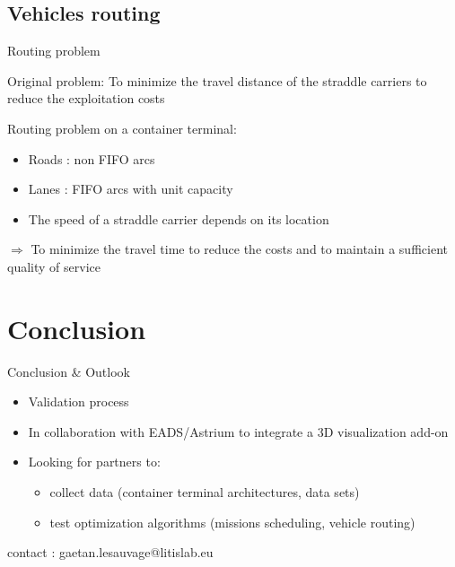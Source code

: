 \documentclass{beamer}
\begin{document}
\subsection*{Vehicles routing}
\begin{frame}{Routing problem}
    \begin{block}{Original problem: }
      To minimize the travel distance of the straddle carriers to reduce the exploitation costs
    \end{block}
\pause
    \begin{block}{Routing problem on a container terminal:}
       \begin{itemize} 
	  \item Roads : non FIFO arcs
	  \item Lanes : FIFO arcs with unit capacity
	  \item The speed of a straddle carrier depends on its location
	
	\end{itemize}
	\pause
	\begin{center}
	    $\Rightarrow$ To minimize the travel time to reduce the costs and to maintain a sufficient quality of service
	  \end{center}
    \end{block}
  \end{frame}

\section{Conclusion}
    \begin{frame}{Conclusion \& Outlook}
    \begin{itemize}
     \item Validation process
    \pause
     \item In collaboration with EADS/Astrium to integrate a 3D visualization add-on
    \pause
     \item Looking for partners to: 
	\begin{itemize}
	 \item collect data (container terminal architectures, data sets)
	 \item test optimization algorithms (missions scheduling, vehicle routing)
	\end{itemize}
    \end{itemize}
  \pause
  \begin{center}
  contact : gaetan.lesauvage@litislab.eu
  \end{center}
  \end{frame}
\end{document}

